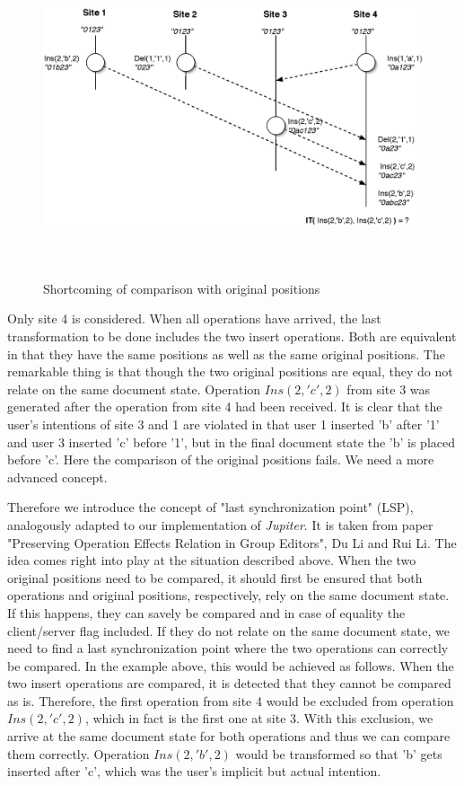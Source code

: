 \begin{itemize}
\begin{figure}[H]
\centering
\includegraphics[height=3.69in,width=6.42in]{../../images/algo-impl/transform_ins_ins_lsp.eps}
\caption{Shortcoming of comparison with original positions}
\label{Shortcoming of comparison with original positions}
\end{figure}

Only site 4 is considered. When all operations have arrived, the last transformation to be done includes the two insert operations. Both are equivalent in that they have the same positions as well as the same original positions. The remarkable thing is that though the two original positions are equal, they do not relate on the same document state. Operation $Ins(2,'c',2)$ from site 3 was generated after the operation from site 4 had been received. It is clear that the user's intentions of site 3 and 1 are violated in that user 1 inserted 'b' after '1' and user 3 inserted 'c' before '1', but in the final document state the 'b' is placed before 'c'. Here the comparison of the original positions fails. We need a more advanced concept. 

Therefore we introduce the concept of "last synchronization point" (LSP), analogously adapted to our implementation of \emph{Jupiter}. It is taken from paper "Preserving Operation Effects Relation in Group Editors", Du Li and Rui Li. The idea comes right into play at the situation described above. When the two original positions need to be compared, it should first be ensured that both operations and original positions, respectively, rely on the same document state. If this happens, they can savely be compared and in case of equality the client/server flag included. If they do not relate on the same document state, we need to find a last synchronization point where the two operations can correctly be compared. In the example above, this would be achieved as follows. When the two insert operations are compared, it is detected that they cannot be compared as is. Therefore, the first operation from site 4 would be excluded from  operation $Ins(2,'c',2)$, which in fact is the first one at site 3. With this exclusion, we arrive at the same document state for both operations and thus we can compare them correctly. Operation $Ins(2,'b',2)$ would be transformed so that 'b' gets inserted after 'c', which was the user's implicit but actual intention.


\end{itemize}
